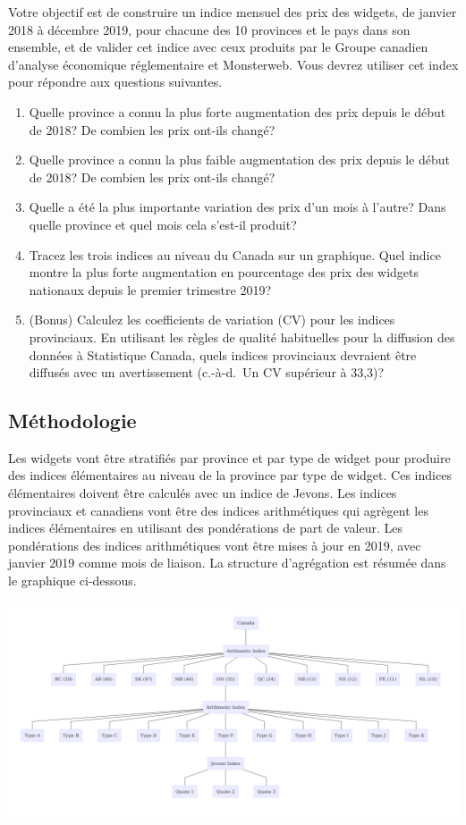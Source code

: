 \documentclass[]{article}
\begin{document}
Votre objectif est de construire un indice mensuel des prix des widgets, de janvier 2018 à décembre 2019, pour chacune des 10 provinces et le pays dans son ensemble, et de valider cet indice avec ceux produits par le Groupe canadien d'analyse économique réglementaire et Monsterweb. Vous devrez utiliser cet index pour répondre aux questions suivantes.

\begin{enumerate}
\def\labelenumi{\arabic{enumi}.}
\item
  Quelle province a connu la plus forte augmentation des prix depuis le début de 2018? De combien les prix ont-ils changé?
\item
  Quelle province a connu la plus faible augmentation des prix depuis le début de 2018? De combien les prix ont-ils changé?
\item
  Quelle a été la plus importante variation des prix d'un mois à l'autre? Dans quelle province et quel mois cela s'est-il produit?
\item
  Tracez les trois indices au niveau du Canada sur un graphique. Quel indice montre la plus forte augmentation en pourcentage des prix des widgets nationaux depuis le premier trimestre 2019?
\item
  (Bonus) Calculez les coefficients de variation (CV) pour les indices provinciaux. En utilisant les règles de qualité habituelles pour la diffusion des données à Statistique Canada, quels indices provinciaux devraient être diffusés avec un avertissement (c.-à-d.~Un CV supérieur à 33,3)?
\end{enumerate}

\hypertarget{muxe9thodologie}{%
\subsection{Méthodologie}\label{muxe9thodologie}}

Les widgets vont être stratifiés par province et par type de widget pour produire des indices élémentaires au niveau de la province par type de widget. Ces indices élémentaires doivent être calculés avec un indice de Jevons. Les indices provinciaux et canadiens vont être des indices arithmétiques qui agrègent les indices élémentaires en utilisant des pondérations de part de valeur. Les pondérations des indices arithmétiques vont être mises à jour en 2019, avec janvier 2019 comme mois de liaison. La structure d'agrégation est résumée dans le graphique ci-dessous.

\includegraphics{img/structure.png}
\end{document}
